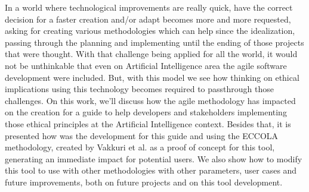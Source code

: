 In a world where technological improvements are really quick, have the correct decision for a faster creation and/or adapt becomes more and more requested, asking for creating various methodologies which can help since the idealization, passing through the planning and implementing until the ending of those projects that were thought. With that challenge being applied for all the world, it would not be unthinkable that even on Artificial Intelligence area the agile software development were included. But, with this model we see how thinking on ethical implications using this technology becomes required to passthrough those challenges. On this work, we'll discuss how the agile methodology has impacted on the creation for a guide to help developers and stakeholders implementing those ethical principles at the Artificial Intelligence context. Besides that, it is presented how was the development for this guide and using the ECCOLA methodology, created by Vakkuri et al. \cite{ECCOLA} as a proof of concept for this tool, generating an immediate impact for potential users. We also show how to modify this tool to use with other methodologies with other parameters, user cases and future improvements, both on future projects and on this tool development.


